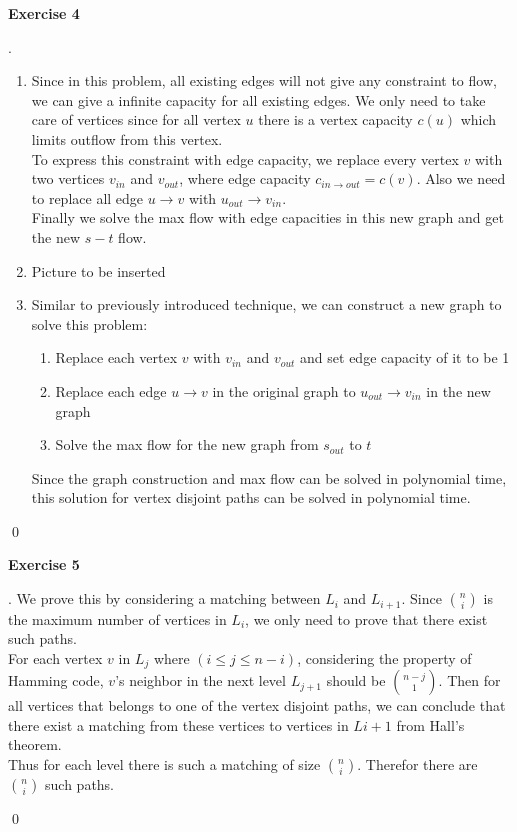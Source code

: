 \documentclass[12pt, notitlepage]{article}
\newenvironment{sol}
  {\par\vspace{3mm}\noindent{\it Solution}.}{\qed}
\begin{document}
\textbf{Exercise 4}
\begin{sol}
	\begin{enumerate}[1.]
		\item Since in this problem, all existing edges will not give any constraint to flow, we can give a infinite capacity for all existing edges. We only need to take care of vertices since for all vertex $u$ there is a vertex capacity $c(u)$ which limits outflow from this vertex.\\
			To express this constraint with edge capacity, we replace every vertex $v$ with two vertices $v_{in}$ and $v_{out}$, where edge capacity $c_{in\rightarrow out} = c(v)$. Also we need to replace all edge $u\rightarrow v$ with $u_{out}\rightarrow v_{in}$.\\
			Finally we solve the max flow with edge capacities in this new graph and get the new $s-t$ flow.
	\item Picture to be inserted
	\item Similar to previously introduced technique, we can construct a new graph to solve this problem:
		\begin{enumerate}[(1)]
			\item Replace each vertex $v$ with $v_{in}$ and $v_{out}$ and set edge capacity of it to be 1
			\item Replace each edge $u\rightarrow v$ in the original graph to $u_{out}\rightarrow v_{in}$ in the new graph
			\item Solve the max flow for the new graph from $s_{out}$ to $t$
		\end{enumerate}
		Since the graph construction and max flow can be solved in polynomial time, this solution for vertex disjoint paths can be solved in polynomial time.
	\end{enumerate}
\end{sol}


\textbf{Exercise 5}
\begin{sol}
	We prove this by considering a matching between $L_i$ and $L_{i+1}$. Since $\binom{n}{i}$ is the maximum number of vertices in $L_i$, we only need to prove that there exist such paths.\\
	For each vertex $v$ in $L_{j}$ where $(i\leq j\leq n-i)$, considering the property of Hamming code, $v$'s neighbor in the next level $L_{j+1}$ should be $\binom{n-j}{1}$. Then for all vertices that belongs to one of the vertex disjoint paths, we can conclude that there exist a matching from these vertices to vertices in $L{i+1}$ from Hall's theorem.\\
	Thus for each level there is such a matching of size $\binom{n}{i}$. Therefor there are $\binom{n}{i}$ such paths.

\end{sol}
\end{document}

